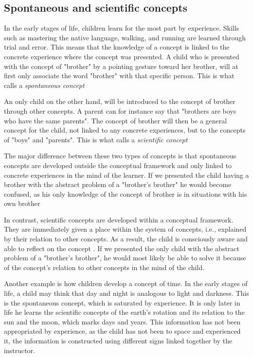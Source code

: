 \subsection{Spontaneous and scientific concepts} \label{cha:spontaneous_scientific}
In the early stages of life, children learn for the most part by experience. Skills such as mastering the native language, walking, and running are learned through trial and error. This means that the knowledge of a concept is linked to the concrete experience where the concept was presented. A child who is presented with the concept of "brother" by a pointing gesture toward her brother, will at first only associate the word "brother" with that specific person. This is what \citeauthor{vygotsky2012thought} calls a \emph{spontaneous concept}

An only child on the other hand, will be introduced to the concept of brother through other concepts. A parent can for instance say that "brothers are boys who have the same parents". The concept of brother will then be a general concept for the child, not linked to any concrete experiences, but to the concepts of "boys" and "parents". This is what \citeauthor{vygotsky2012thought} calls a \emph{scientific concept}

The major difference between these two types of concepts is that spontaneous concepts are developed outside the conceptual framework and only linked to concrete experiences in the mind of the learner. If we presented the child having a brother with the abstract problem of a "brother's brother" \citep{vygotsky2012thought} he would become confused, as his only knowledge of the concept of brother is in situations with his own brother

In contrast, scientific concepts are developed within a conceptual framework. They are immediately given a place within the system of concepts, i.e., explained by their relation to other concepts. As a result, the child is consciously aware and able to reflect on the concept \citep{van1998concept}. If we presented the only child with the abstract problem of a "brother's brother", he would most likely be able to solve it because of the concept's relation to other concepts in the mind of the child. 

Another example is how children develop a concept of time. In the early stages of life, a child may think that day and night is analogous to light and darkness. This is the spontaneous concept, which is saturated by experience. It is only later in life he learns the scientific concepts of the earth's rotation and its relation to the sun and the moon, which marks days and years. This information has not been appropriated by experience, as the child has not been to space and experienced it, the information is constructed using different signs linked together by the instructor. 


